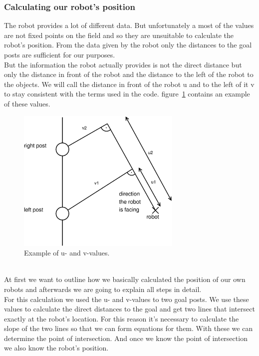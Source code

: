 \documentclass[lnicst,a4paper]{svmultln}
\begin{document}
\subsubsection{Calculating our robot's position}
The robot provides a lot of different data.
But unfortunately a most of the values are not fixed points on the field and so they are unsuitable to calculate the robot's position. From the data given by the robot only the distances to the goal posts are sufficient for our purposes.
\\
But the information the robot actually provides is not the direct distance but only the distance in front of the robot and the distance to the left of the robot to the objects. We will call the distance in front of the robot u and to the left of it v to stay consistent with the terms used in the code. figure~\ref{fig:uvvalues} contains an example of these values.
\begin{figure}
 	\centerline{\includegraphics[width=0.7\textwidth]{uvvalues.pdf}}
	{\caption{Example of u- and v-values.}\label{fig:uvvalues}}
\end{figure}
\\
At first we want to outline how we basically calculated the position of our own robots and afterwards we are going to explain all steps in detail.
\\
For this calculation we used the u- and v-values to two goal posts. We use these values to calculate the direct distances to the goal and get two lines that intersect exactly at the robot's location. For this reason it's necessary to calculate the slope of the two lines so that we can form equations for them. With these we can determine the point of intersection. And once we know the point of intersection we also know the robot's position.
\\
\end{document}
